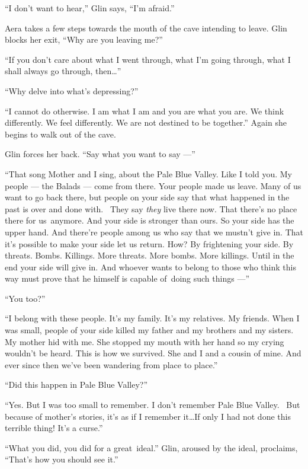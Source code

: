 \documentclass[twoside,11pt,openany]{book}
\begin{document}
``I don't want to hear,'' Glin says, ``I'm afraid.''

Aera takes a few steps towards the mouth{ }of the cave intending to leave. Glin blocks her exit,
``Why are you leaving me?''

``If you don't care about what I went through, what I'm going through, what I shall always go through, then{\ldots}''

``Why delve into what's depressing?''

``I cannot do otherwise. I am what I am and you are what you are. We think differently. We feel differently.
We are not destined to be together.'' Again she begins to walk out of the cave.

Glin forces her back. ``Say what you want to say ---''

``That song Mother and I sing, about the Pale Blue Valley. Like I told you. My people --- the Balads --- come
from there. Your people made us leave. Many of us want to go back there, but people on your side say that what happened
in the past is over and done with. ~They say \textit{they }live there now. That there's no place there for us~anymore.
And your side is stronger than ours. So your side has the upper hand. And there're people among us who say that we
mustn't give in. That it's possible to make your side let us return. How? By frightening your side. By threats. Bombs.
Killings. More threats. More bombs. More killings. Until in the end your side will give in. And whoever wants to belong
to those who think this way must prove that he himself is capable of~doing such things ---''

``You too?''

``I belong with these people. It's my family. It's my relatives. My friends. When I was small, people of
your side killed my father and my brothers and my sisters. My mother hid with me. She stopped my mouth with her hand so
my crying wouldn't be heard. This is how we survived. She and I and a cousin of mine. And ever since then we've been
wandering from place to place.''

``Did this happen in Pale Blue Valley?''

``Yes. But I was too small to remember. I don't remember Pale Blue Valley. ~But because of mother's
stories, it's as if I remember it{\ldots}If only I had not done this terrible thing! It's a curse.''

``What you did, you did for a great~ideal.'' Glin, aroused by{ }the ideal, proclaims,
``That's how you should see it.''
\end{document}
